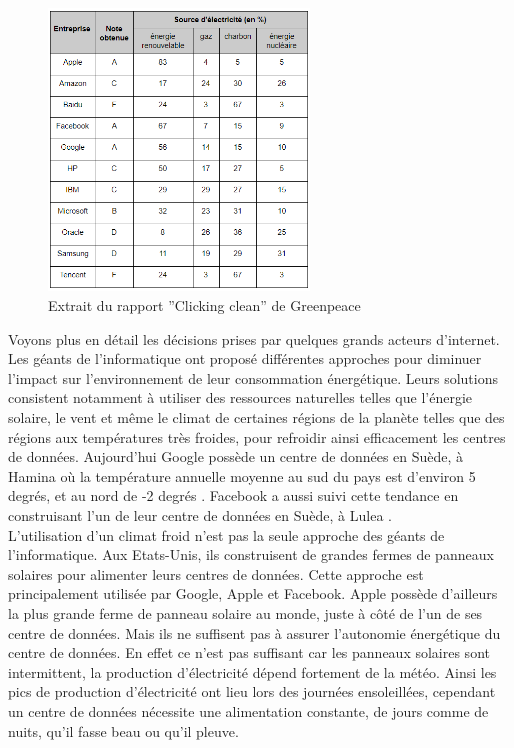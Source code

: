 \documentclass[a4paper,twocolumn,12pt]{article}
\begin{document}
\begin{figure}[!h]	
\centerline{\includegraphics[height=7.5cm]{picture/tableauGreenpeace.png}}
\caption{Extrait du rapport ''Clicking clean'' de Greenpeace \cite{12}}
\label{tableauGreenpeace}
\end{figure}	
		
	Voyons plus en détail les décisions prises par quelques grands acteurs d’internet. Les géants de l’informatique ont proposé différentes approches pour diminuer l’impact sur l’environnement de leur consommation énergétique. Leurs solutions consistent notamment à utiliser des ressources naturelles telles que l'énergie solaire, le vent et même le climat de certaines régions de la planète telles que des régions aux températures très froides, pour refroidir ainsi efficacement les centres de données. Aujourd’hui Google possède un centre de données en Suède, à Hamina où la température annuelle moyenne au sud du pays est d'environ 5 degrés, et au nord de -2 degrés \cite{13,14}. Facebook a aussi suivi cette tendance en construisant l’un de leur centre de données en Suède, à Lulea \cite{15}. \\
	
	L’utilisation d’un climat froid n'est pas la seule approche des géants de l’informatique. Aux Etats-Unis, ils construisent de grandes fermes de panneaux solaires pour alimenter leurs centres de données. Cette approche est principalement utilisée par Google, Apple et Facebook. Apple possède d’ailleurs la plus grande ferme de panneau solaire au monde, juste à côté de l’un de ses centre de données. Mais ils ne suffisent pas à assurer l’autonomie énergétique du centre de données. En effet ce n’est pas suffisant car les panneaux solaires sont intermittent, la production d'électricité dépend fortement de la météo. Ainsi les pics de production d'électricité ont lieu lors des journées ensoleillées, cependant un centre de données nécessite une alimentation constante, de jours comme de nuits, qu’il fasse beau ou qu’il pleuve. \\
\end{document}
